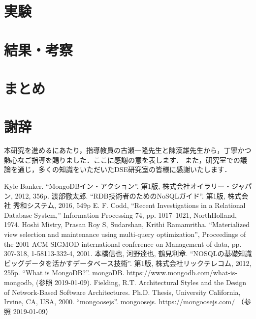\documentclass[uplatex]{deimj}
\begin{document}
\section{実験}
\section{結果・考察}
\section{まとめ}

\section{謝辞}
  本研究を進めるにあたり，指導教員の古瀬一隆先生と陳漢雄先生から，丁寧かつ熱心なご指導を賜りました．ここに感謝の意を表します．
  また，研究室での議論を通じ，多くの知識をいただいたDSE研究室の皆様に感謝いたします．

\vspace{2em}

\begin{thebibliography}{99}
     Kyle Banker. “MongoDBイン・アクション”. 第1版, 株式会社オイラリー・ジャパン, 2012, 356p.
    渡部徹太郎. “RDB技術者のためのNoSQLガイド”. 第1版, 株式会社 秀和システム, 2016, 549p
    E. F. Codd, “Recent Investigations in a Relational Database
    System,” Information Processing 74, pp. 1017–1021, NorthHolland, 1974.
    Hoshi Mistry, Prasan Roy S, Sudarshan, Krithi Ramamritha.
    “Materialized view selection and maintenance using multi-query optimization”, Proceedings of the 2001 ACM SIGMOD international conference on Management of data, pp. 307-318, 1-58113-332-4, 2001.
    本橋信也, 河野達也, 鶴見利章.
    “NOSQLの基礎知識 ビッグデータを活かすデータベース技術”. 第1版, 株式会社リックテレコム, 2012, 255p.
    “What is MongoDB?”. mongoDB. https://www.mongodb.com/what-is-mongodb, (参照 2019-01-09).
    Fielding, R.T. Architectural Styles and the Design of Network-Based Software Architectures. Ph.D. Thesis,
    University California, Irvine, CA, USA, 2000.
    “mongoosejs”. mongoosejs. https://mongoosejs.com/ （参照 2019-01-09）
\end{thebibliography}
\end{document}
